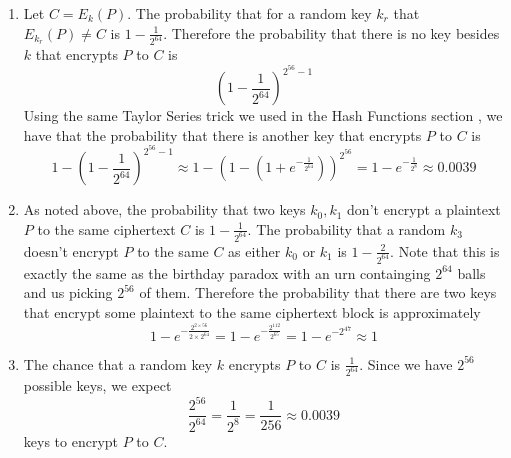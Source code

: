 \begin{enumerate}
    \item Let $C = E_k(P)$. The probability that for a random key $k_r$ that $E_{k_r}(P) \neq C$ is $1-\frac{1}{2^{64}}$. Therefore the probability that there is no key besides $k$ that encrypts $P$ to $C$ is \[\left(1 - \frac{1}{2^{64}}\right)^{2^{56}-1}\] Using the same Taylor Series trick we used in the Hash Functions section \cite{Slides_37}, we have that the probability that there is another key that encrypts $P$ to $C$ is
    \[1 - \left(1 - \frac{1}{2^{64}}\right)^{2^{56} - 1} \approx 1 - \left(1 - (1 + e^{-\frac{1}{2^{64}}})\right)^{2^{56}} = 1 - e^{-\frac{1}{2^{8}}} \approx 0.0039\]
    \item As noted above, the probability that two keys $k_0, k_1$ don't encrypt a plaintext $P$ to the same ciphertext $C$ is $1 - \frac{1}{2^{64}}$. The probability that a random $k_3$ doesn't encrypt $P$ to the same $C$ as either $k_0$ or $k_1$ is $1 - \frac{2}{2^{64}}$. Note that this is exactly the same as the birthday paradox \cite{Slides_44} with an urn containging $2^{64}$ balls and us picking $2^{56}$ of them. Therefore the probability that there are two keys that encrypt some
        plaintext to the same ciphertext block is approximately \[1 - e^{-\frac{2^{2 \times 56}}{2 \times 2^{64}}} = 1 - e^{-\frac{2^{112}}{2^{65}}} = 1 - e^{-2^{47}} \approx 1\]
    \item The chance that a random key $k$ encrypts $P$ to $C$ is $\frac{1}{2^{64}}$. Since we have $2^{56}$ possible keys, we expect \[\frac{2^{56}}{2^{64}} = \frac{1}{2^8} = \frac{1}{256} \approx 0.0039\] keys to encrypt $P$ to $C$.
\end{enumerate}
